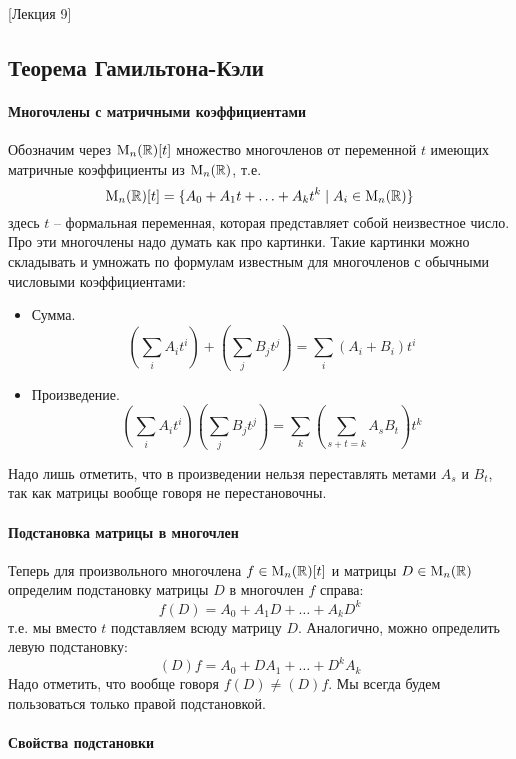 [Лекция 9]


\subsection{Теорема Гамильтона-Кэли}

\paragraph{Многочлены с матричными коэффициентами}

Обозначим через $\operatorname{M}_{n}(\mathbb R)[t]$ множество многочленов от переменной $t$ имеющих матричные коэффициенты из $\operatorname{M}_{n}(\mathbb R)$, т.е.
\[
\operatorname{M}_{n}(\mathbb R)[t] = \{A_0+A_1t+\ldots + A_k t^k\mid A_i\in \operatorname{M}_{n}(\mathbb R)\}
\]
здесь $t$ -- формальная переменная, которая представляет собой неизвестное число.
Про эти многочлены надо думать как про картинки.
Такие картинки можно складывать и умножать по формулам известным для многочленов с обычными числовыми коэффициентами:
\begin{itemize}
\item Сумма.
\[
\left(\sum_{i}A_i t^i\right) +\left (\sum_{j}B_j t^j\right) = \sum_{i}(A_i+ B_i) t^i
\]

\item Произведение.
\[
\left(\sum_i A_i t^i\right)\left( \sum_j B_j t^j\right) = \sum_k \left(\sum_{s+t = k}A_s B_t\right)t^k
\]
\end{itemize}
Надо лишь отметить, что в произведении нельзя переставлять метами $A_s$ и $B_t$, так как матрицы вообще говоря не перестановочны.

\paragraph{Подстановка матрицы в многочлен} 

Теперь для произвольного многочлена $f\in\operatorname{M}_{n}(\mathbb R)[t]$ и матрицы $D\in\operatorname{M}_{n}(\mathbb R)$ определим подстановку матрицы $D$ в многочлен $f$ справа:
\[
f(D) = A_0 + A_1 D + \ldots + A_k D^k
\]
т.е. мы вместо $t$ подставляем всюду матрицу $D$.
Аналогично, можно определить левую подстановку:
\[
(D)f = A_0 + D A_1 + \ldots + D^k A_k
\]
Надо отметить, что вообще говоря $f(D)\neq (D)f$.
Мы всегда будем пользоваться только правой подстановкой.

\paragraph{Свойства подстановки}

